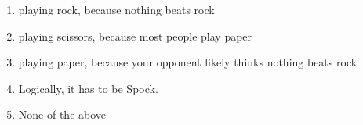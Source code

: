 \documentclass[11pt,]{article}
\providecommand{\tightlist}{%
  \setlength{\itemsep}{0pt}\setlength{\parskip}{0pt}}
\begin{document}
\begin{enumerate}
\def\labelenumi{\Alph{enumi})}
\tightlist
\item
  playing rock, because nothing beats rock
\item
  playing scissors, because most people play paper
\item
  playing paper, because your opponent likely thinks nothing beats rock
\item
  Logically, it has to be Spock.
\item
  None of the above
\end{enumerate}
\end{document}
